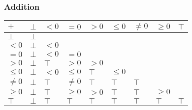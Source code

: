\documentclass[aspectratio=169]{beamer}
\begin{document}
\begin{frame}
    \frametitle{Addition}
\begin{table}[]
    \begin{tabular}{|l|l|l|l|l|l|l|l|l|}
    \hline
    $+$     & $\bot$ & $<0$   & $=0$    & $>0$   & $\le 0$ & $\ne 0$ & $\ge 0$ & $\top$ \\ \hline
    $\bot$  & $\bot$ &        &         &        &         &         &         &        \\ \hline
    $<0$    & $\bot$ & $<0$   &         &        &         &         &         &        \\ \hline
    $=0$    & $\bot$ & $<0$   & $=0$    &        &         &         &         &        \\ \hline
    $>0$    & $\bot$ & $\top$ & $>0$    & $>0$   &         &         &         &        \\ \hline
    $\le 0$ & $\bot$ & $<0$   & $\le 0$ & $\top$ & $\le 0$ &         &         &        \\ \hline
    $\ne 0$ & $\bot$ & $\top$ & $\ne 0$ & $\top$ & $\top$  & $\top$  &         &        \\ \hline
    $\ge 0$ & $\bot$ & $\top$ & $\ge 0$ & $>0$   & $\top$  & $\top$  & $\ge 0$ &        \\ \hline
    $\top$  & $\bot$ & $\top$ & $\top$  & $\top$ & $\top$  & $\top$  & $\top$  & $\top$ \\ \hline
    \end{tabular}
    \end{table}
\end{frame}
    
\end{document}
